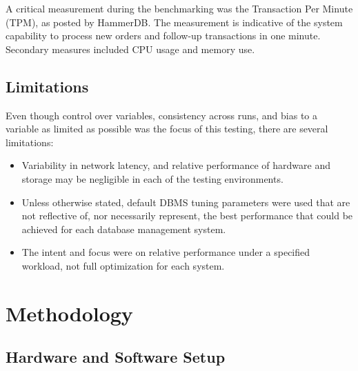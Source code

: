 A critical measurement during the benchmarking was the Transaction Per Minute (TPM), as posted by HammerDB. The measurement is indicative of the system capability to process new orders and follow-up transactions in one minute. Secondary measures included CPU usage and memory use.

\subsection{Limitations}

Even though control over variables, consistency across runs, and bias to a variable as limited as possible was the focus of this testing, there are several limitations:

\begin{itemize}
    \setlength\itemsep{0.1em}
    \item Variability in network latency, and relative performance of hardware and storage may be negligible in each of the testing environments.
    \item Unless otherwise stated, default DBMS tuning parameters were used that are not reflective of, nor necessarily represent, the best performance that could be achieved for each database management system.
    \item The intent and focus were on relative performance under a specified workload, not full optimization for each system.
\end{itemize}


\section{Methodology}
\label{sec:methodology}

\subsection{Hardware and Software Setup}
\label{sec:hardware-software-setup}

